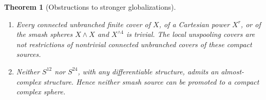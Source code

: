 \documentclass[11pt,letterpaper]{article}
\numberwithin{equation}{section}
\newtheorem{theorem}{Theorem}[section]
\theoremstyle{definition}
\theoremstyle{remark}
\begin{document}
\begin{theorem}[Obstructions to stronger globalizations]
\begin{enumerate}[label=\textup{(\roman*)}]
This product obstruction does not obstruct the preceding smash-source maps.
The global quotient $q_2:(X,x_0)\to(\mathcal A,v_0)$ is based and hence
$q_2\times q_2$ is constant on the global fat wedge
$X\vee X\subset X\times X$.  It therefore induces
$q_2^{\wedge2}:X\wedge X\to\mathcal A\wedge\mathcal A$, whose source is
$S^{12}$.  Since $x_0$ lies on the central fibre, the regular radial product
$F_T^2$ is disjoint from that fat wedge; the product-to-smash quotient is
injective there and the restriction is exactly $\pi_T\times\pi_T$ under the
markings.  This differs from trying to factor the torus map
$\pi_T\times\pi_T$ through $F_T\wedge F_T$ with the fibre identity as
basepoint, which is impossible because the map is nonconstant on that
fibrewise fat wedge.

\item Every connected unbranched finite cover of $X$, of a Cartesian
power $X^r$, or of the smash spheres $X\wedge X$ and $X^{\wedge4}$ is
trivial.  The local unspooling covers are not restrictions of nontrivial
connected unbranched covers of these compact sources.

\item Neither $S^{12}$ nor $S^{24}$, with any differentiable structure,
admits an almost-complex structure.  Hence neither smash source can be
promoted to a compact complex sphere.
\end{enumerate}
\end{theorem}
\end{document}

